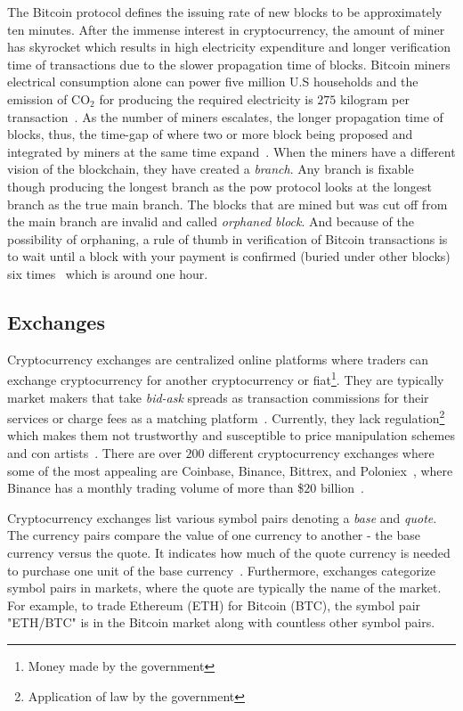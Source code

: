 The Bitcoin protocol defines the issuing rate of new blocks to be approximately ten minutes. After the immense interest in cryptocurrency, the amount of miner has skyrocket which results in high electricity expenditure and longer verification time of transactions due to the slower propagation time of blocks. Bitcoin miners electrical consumption alone can power five million U.S households and the emission of CO$_2$ for producing the required electricity is $275$ kilogram per transaction~\cite{bitcoin_power}. As the number of miners escalates, the longer propagation time of blocks, thus, the time-gap of where two or more block being proposed and integrated by miners at the same time expand~\cite{trans_fee}. When the miners have a different vision of the blockchain, they have created a \emph{branch}. Any branch is fixable though producing the longest branch as the \ac{pow} protocol looks at the longest branch as the true main branch. The blocks that are mined but was cut off from the main branch are invalid and called \emph{orphaned block}. And because of the possibility of orphaning, a rule of thumb in verification of Bitcoin transactions is to wait until a block with your payment is confirmed (buried under other blocks) six times~\cite{bitcoin_verification_1, bitcoin_verification_2} which is around one hour.

\subsection{Exchanges}\label{sec:exchanges}
Cryptocurrency exchanges are centralized online platforms where traders can exchange cryptocurrency for another cryptocurrency or fiat\footnote{Money made by the government\cite{fiat}}. They are typically market makers that take \emph{bid-ask} spreads as transaction commissions for their services or charge fees as a matching platform~\cite{norton_rose}. Currently, they lack regulation\footnote{Application of law by the government} which makes them not trustworthy and susceptible to price manipulation schemes and con artists~\cite{exchange_scammers, exchange_scammers_2}. There are over $200$ different cryptocurrency exchanges where some of the most appealing are Coinbase, Binance, Bittrex, and Poloniex~\cite{exchange_best_1, exchange_best_2}, where Binance has a monthly trading volume of more than \$$20$ billion~\cite{coinmarketcap_exchange}.

Cryptocurrency exchanges list various symbol pairs denoting a \emph{base} and \emph{quote}. The currency pairs compare the value of one currency to another - the base currency versus the quote. It indicates how much of the quote currency is needed to purchase one unit of the base currency~\cite{investopedia_cryptocurrency}. Furthermore, exchanges categorize symbol pairs in markets, where the quote are typically the name of the market. For example, to trade Ethereum (ETH) for Bitcoin (BTC), the symbol pair "ETH/BTC" is in the Bitcoin market along with countless other symbol pairs.

